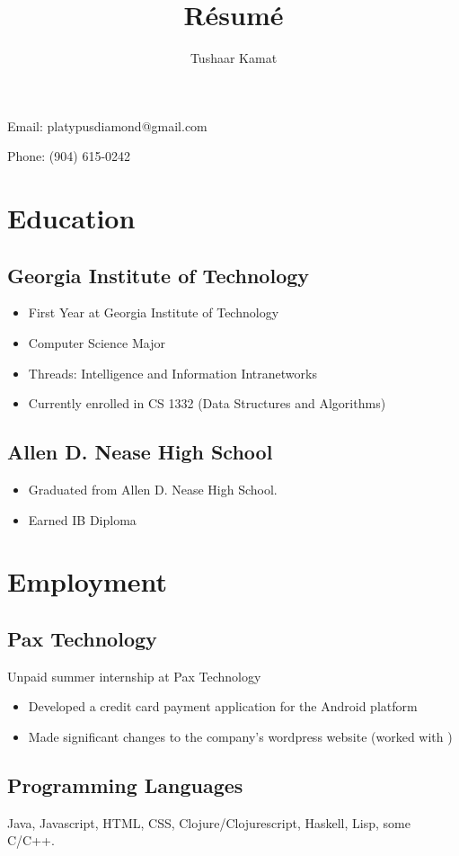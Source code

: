 \documentclass[12pt, noindent]{article}
\author{Tushaar Kamat}
\title{R\'esum\'e}
\makeatletter
\renewcommand{\maketitle}{
  \begin{center}
  \begin{Huge}
    \theauthor
  \end{Huge}

  Email: platypusdiamond@gmail.com

  Phone: (904) 615-0242
  \end{center}
}
\makeatother
\begin{document}
\maketitle

\section{Education} 
\subsection{Georgia Institute of Technology}
\begin{itemize}
\itemsep0em
\item First Year at Georgia Institute of Technology
\item Computer Science Major
\item Threads: Intelligence and Information Intranetworks
\item Currently enrolled in CS 1332 (Data Structures and Algorithms)
\end{itemize}
\subsection{Allen D. Nease High School}
\begin{itemize}
\itemsep0em 
\item Graduated from Allen D. Nease High School.
\item Earned IB Diploma
\end{itemize}

\section{Employment}
\subsection{Pax Technology}
Unpaid summer internship at Pax Technology
\begin{itemize}
\itemsep0em
\item Developed a credit card payment application for the Android platform
\item Made significant changes to the company's wordpress website (worked with )
\end{itemize}

\subsection{Programming Languages}
Java, Javascript, HTML, CSS, Clojure/Clojurescript, Haskell, Lisp, some C/C++.
\end{document}
